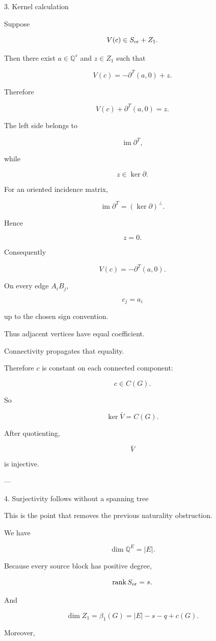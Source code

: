 3. Kernel calculation

Suppose

\[
V(c)\in S_{\rm or}+Z_1.
\]

Then there exist \(a\in\mathbb Q^s\) and \(z\in Z_1\) such that

\[
V(c)= -\partial^T(a,0)+z.
\]

Therefore

\[
V(c)+\partial^T(a,0)=z.
\]

The left side belongs to

\[
\operatorname{im}\partial^T,
\]

while

\[
z\in\ker\partial.
\]

For an oriented incidence matrix,

\[
\operatorname{im}\partial^T
=
(\ker\partial)^\perp.
\]

Hence

\[
z=0.
\]

Consequently

\[
V(c)=-\partial^T(a,0).
\]

On every edge \(A_iB_j\),

\[
c_j=a_i
\]

up to the chosen sign convention.

Thus adjacent vertices have equal coefficient.

Connectivity propagates that equality.

Therefore \(c\) is constant on each connected component:

\[
c\in C(G).
\]

So

\[
\boxed{
\ker\bar V=C(G).
}
\]

After quotienting,

\[
\bar V
\]

is injective.


---

4. Surjectivity follows without a spanning tree

This is the point that removes the previous naturality obstruction.

We have

\[
\dim\mathbb Q^E=|E|.
\]

Because every source block has positive degree,

\[
\operatorname{rank}S_{\rm or}=s.
\]

And

\[
\dim Z_1=\beta_1(G)
=|E|-s-q+c(G).
\]

Moreover,

